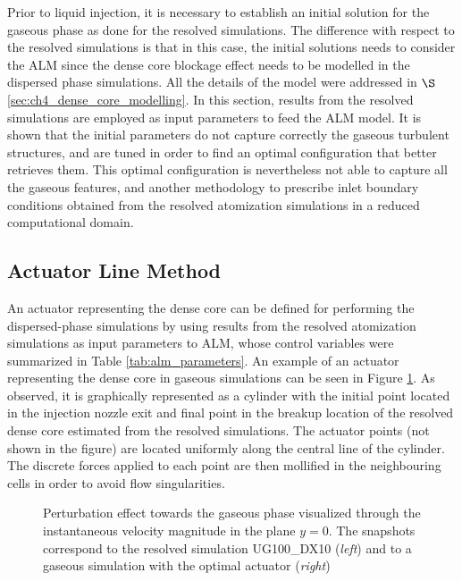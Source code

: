 Prior to liquid injection, it is necessary to establish an initial solution for the gaseous phase as done for the resolved simulations. The difference with respect to the resolved simulations is that in this case, the initial solutions needs to consider the ALM since the dense core blockage effect needs to be modelled in the dispersed phase simulations. All the details of the model were addressed in $\S$\ref{sec:ch4_dense_core_modelling}. In this section, results from the resolved simulations are employed as input parameters to feed the ALM model. It is shown that the initial parameters do not capture correctly the gaseous turbulent structures, and are tuned in order to find an optimal configuration that better retrieves them. This optimal configuration is nevertheless not able to capture all the gaseous features, and another methodology to prescribe inlet boundary conditions obtained from the resolved atomization simulations in a reduced computational domain.


\subsection{Actuator Line Method}


An actuator representing the dense core can be defined for performing the dispersed-phase simulations by using results from the resolved atomization simulations as input parameters to ALM, whose control variables were summarized in Table \ref{tab:alm_parameters}. An example of an actuator representing the dense core in gaseous simulations can be seen in Figure \ref{fig:u_inst_SPS_and_ALM}. As observed, it is graphically represented as a cylinder with the initial point located in the injection nozzle exit and final point in the breakup location of the resolved dense core estimated from the resolved simulations. The actuator points (not shown in the figure) are located uniformly along the central line of the cylinder. The discrete forces applied to each point are then mollified in the neighbouring cells in order to avoid flow singularities.


\begin{figure}[h!]
	\centering	{}
	\caption[Perturbation effect towards the gaseous phase visualized through the instantaneous velocity magnitude in the plane $y = 0$]{Perturbation effect towards the gaseous phase visualized through the instantaneous velocity magnitude in the plane $y = 0$. The snapshots correspond to the resolved simulation UG100\_DX10 (\textsl{left}) and to a gaseous simulation with the optimal actuator (\textsl{right})}	
	\label{fig:u_inst_SPS_and_ALM}
\end{figure}


